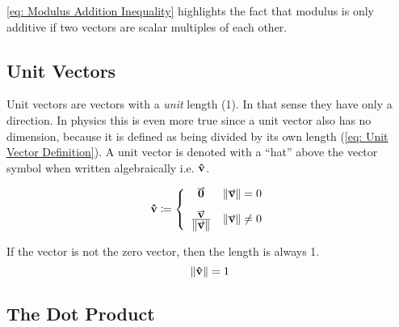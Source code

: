 \documentclass[main.tex]{subfiles}
\begin{document}
                    \eqref{eq: Modulus Addition Inequality} highlights the fact that modulus is only additive if two vectors are scalar multiples of each other.

                    




            \subsection{Unit Vectors}
                \label{subsec: Unit Vectors}

                Unit vectors are vectors with a \textit{unit} length (1). In that sense they have only a direction. In physics this is even more true since a unit vector also has no dimension, because it is defined as being divided by its own length (\eqref{eq: Unit Vector Definition}). A unit vector is denoted with a ``hat'' above the vector symbol when written algebraically i.e. $\boldsymbol{\mathbf{\hat{v}}}$.

                \begin{equation}
                    \vhat{v} \deq \left\{\begin{array}{cr}
                        \vect{0} & \vmod{\vect{v}} = 0\vspace{3mm}\\ 
                        \bfrac{\vect{v}}{\vmod{\vect{v}}} & \vmod{\vect{v}} \neq 0\\
                    \end{array}\right.
                    \label{eq: Unit Vector Definition}
                \end{equation}
                

                If the vector is not the zero vector, then the length is always 1.
                \begin{equation}
                    \left\| \boldsymbol{\mathbf{\hat{v}}} \right\| = 1
                \end{equation}




            
            \newpage
            \subsection{The Dot Product}
                \label{subsubsec: The Dot Product}
\end{document}
